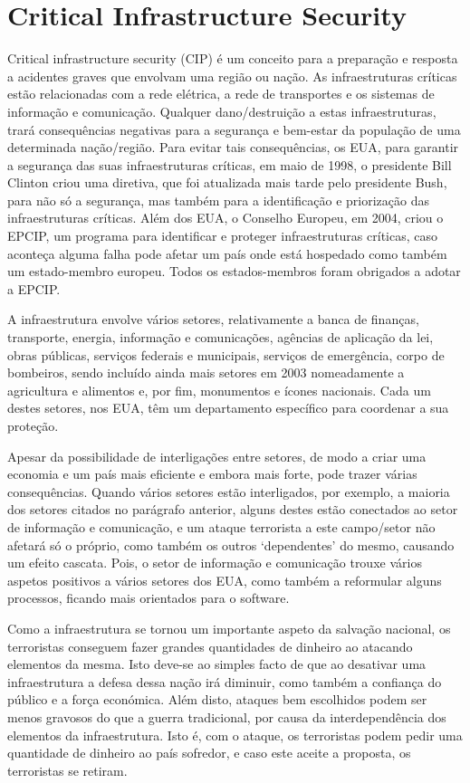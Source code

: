 \documentclass{report}
\begin{document}
\section{Critical Infrastructure Security}
\cite{CIP}
\cite{EPCIP}
\cite{cisa}
\normalsize{Critical infrastructure security (\ac{CIP}) é um conceito para a preparação e resposta a acidentes graves que envolvam uma região ou nação. As infraestruturas críticas estão relacionadas com a rede elétrica, a rede de transportes e os sistemas de informação e comunicação. Qualquer dano/destruição a estas infraestruturas, trará consequências negativas para a segurança e bem-estar da população de uma determinada nação/região. 
Para evitar tais consequências, os \ac{EUA}, para garantir a segurança das suas infraestruturas críticas, em maio de 1998, o presidente Bill Clinton criou uma diretiva, que foi atualizada mais tarde pelo presidente Bush, para não só a segurança, mas também para a identificação e priorização das infraestruturas críticas. Além dos \ac{EUA}, o Conselho Europeu, em 2004, criou o \ac{EPCIP}, um programa para identificar e proteger infraestruturas críticas, caso aconteça alguma falha pode afetar um país onde está hospedado como também um estado-membro europeu. Todos os estados-membros foram obrigados a adotar a \ac{EPCIP}.

A infraestrutura envolve vários setores, relativamente a banca de finanças, transporte, energia, informação e comunicações, agências de aplicação da lei, obras públicas, serviços federais e municipais, serviços de emergência, corpo de bombeiros, sendo incluído ainda mais setores em 2003 nomeadamente a agricultura e alimentos e, por fim, monumentos e ícones nacionais. Cada um destes setores, nos EUA, têm um departamento específico para coordenar a sua proteção. 

	Apesar da possibilidade de interligações entre setores, de modo a criar uma economia e um país mais eficiente e embora mais forte, pode trazer várias consequências. Quando vários setores estão interligados, por exemplo, a maioria dos setores citados no parágrafo anterior, alguns destes estão conectados ao setor de informação e comunicação, e um ataque terrorista a este campo/setor não afetará só o próprio, como também os outros ‘dependentes’ do mesmo, causando um efeito cascata. Pois, o setor de informação e comunicação trouxe vários aspetos positivos a vários setores dos \ac{EUA}, como também a reformular alguns processos, ficando mais orientados para o software. 

Como a infraestrutura se tornou um importante aspeto da salvação nacional, os terroristas conseguem fazer grandes quantidades de dinheiro ao atacando elementos da mesma. Isto deve-se ao simples facto de que ao desativar uma infraestrutura a defesa dessa nação irá diminuir, como também a confiança do público e a força económica. Além disto, ataques bem escolhidos podem ser menos gravosos do que a guerra tradicional, por causa da interdependência dos elementos da infraestrutura. Isto é, com o ataque, os terroristas podem pedir uma quantidade de dinheiro ao país sofredor, e caso este aceite a proposta, os terroristas se retiram.}
	
\end{document}
